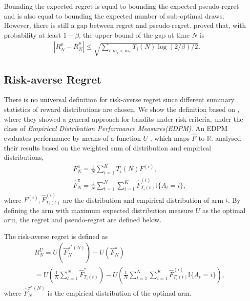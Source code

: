 Bounding the expected regret is equal to bounding the expected pseudo-regret and is also equal to bounding the expected number of sub-optimal draws.
However, there is still a gap between regret and pseudo-regret. \textcite{coquelin2007bandit} proved that, with probability at least $1 - \beta$, the upper bound of the gap at time $N$ is
\begin{align}
    \left|R^\mu_{N}-\overline{R}^\mu_{N}\right| \leq \sqrt{\sum_{i: m_i < m_\ast} T_i(N) \log (2 / \beta) / 2}.
\end{align}

\subsection{Risk-averse Regret}
\label{app-subsec: Risk-averse Regret}

There is no universal definition for risk-averse regret since different summary statistics of reward distributions are chosen. We show the definition based on \textcite{cassel_general_2018}, where they showed a general approach for bandits under risk criteria, under the class of \textit{Empirical Distribution Performance Measures(EDPM)}. An EDPM evaluates performance by means of a function $U$ , which maps $\hat{F} \text { to } \mathbb{R}$. \textcite{cassel_general_2018} analysed their results based on the weighted sum of distribution and empirical distributions,
\begin{align}
    & F_{N}^{\pi}=\frac{1}{N} \sum_{i=1}^{K} T_{i}(N) F^{(i)},\\
    & \hat{F}_{N}^{\pi}= \frac{1}{N} \sum_{t=1}^{N} \sum_{i = 1}^{K} \hat{F}_{T_i(t)}^{(i)} \mathbb{I}\{A_t = i\},
\end{align}
where $F^{(i)}, \hat{F}_{T_i(t)}^{(i)}$ are the distribution and empirical distribution of arm $i$. By defining the arm with maximum expected distribution measure $U$ as the optimal arm, the regret and pseudo-regret are defined below.

\begin{defi}
The risk-averse regret is defined as
\label{defi: regret for cassel}
\begin{align}
    & R_N^{U} =U\left(\hat{F}_{N}^{\pi^{*}(N)}\right)-U\left(\hat{F}_{N}^{\pi}\right)\\
    & = U\left( \frac{1}{N} \sum_{t=1}^N \hat{F}_{T_i(t)}^{\ast} \right)-U\left(\frac{1}{N} \sum_{t=1}^{N} \sum_{i = 1}^{K} \hat{F}_{T_i(t)}^{(i)} \mathbb{I}\{A_t = i\}\right),
\end{align}
where $\hat{F}_{N}^{\pi^{*}(N)}$ is the empirical distribution of the optimal arm.
\end{defi}


